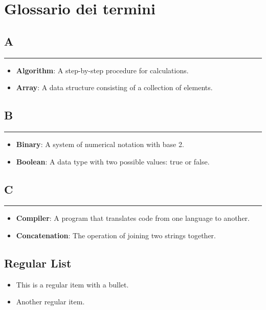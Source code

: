 \chapter{Glossario dei termini}
\newenvironment{glossaryitemize}
  {\begin{itemize}[label={}, leftmargin=*]}
  {\end{itemize}}

\section*{A}
{\color{lightgray}\rule{\textwidth}{0.4pt}} %
\begin{glossaryitemize}
    \item \textbf{Algorithm}: A step-by-step procedure for calculations.
    \item \textbf{Array}: A data structure consisting of a collection of elements.
\end{glossaryitemize}

\section*{B}
{\color{lightgray}\rule{\textwidth}{0.4pt}} %
\begin{glossaryitemize}
    \item \textbf{Binary}: A system of numerical notation with base 2.
    \item \textbf{Boolean}: A data type with two possible values: true or false.
\end{glossaryitemize}

\section*{C}
{\color{lightgray}\rule{\textwidth}{0.4pt}} %
\begin{glossaryitemize}
    \item \textbf{Compiler}: A program that translates code from one language to another.
    \item \textbf{Concatenation}: The operation of joining two strings together.
\end{glossaryitemize}


\section*{Regular List}
\begin{itemize}
    \item This is a regular item with a bullet.
    \item Another regular item.
\end{itemize}